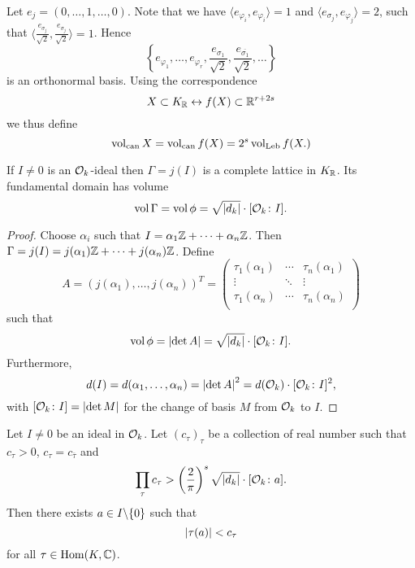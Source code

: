 
\begin{Bsp*}
Let $e_j =(0, \dots, 1,\dots, 0)$.
Note that we have
$\langle e_{\varphi_i} , e_{\varphi_i} \rangle = 1$
and
$\langle e_{\sigma_j} , e_{\varphi_j} \rangle = 2$, such that
 $\langle \frac{e_{\sigma_j}}{\sqrt{2}} , \frac{e_{\sigma_j}}{\sqrt{2}} \rangle = 1$.
 Hence
\[\left\{ e_{\varphi_1}, \dots, e_{\varphi_r}, \frac{e_{\sigma_1}}{\sqrt{2}}, \frac{e_{\overline{\sigma_1}}}{\sqrt{2}}, \dots
\right\}
\]
 is an orthonormal basis. Using the correspondence 
 \[ X \subset K_{\mathbb{R}} \leftrightarrow f(X) \subset \mathbb{R}^{r+2s}
 \]
 we thus define
\[ \operatorname{\operatorname{vol}_{can}} X = \operatorname{\operatorname{vol}_{can}} f(X) = 2^s \operatorname{\operatorname{vol}_{\operatorname{Leb}}} f(X.)
\]
\end{Bsp*}

\begin{Prop}
If $I \neq 0$ is an $\mathcal{O}_k$-ideal then $\Gamma = j(I)$ is a complete lattice in $K_{\mathbb{R}}$.
Its fundamental domain has volume
\[ \operatorname{vol} \Gamma = \operatorname{vol} \phi = \sqrt{\left|{d_k}\right|} \cdot [\mathcal{O}_k\colon I].
\]
\end{Prop}

\begin{proof}
Choose $\alpha_i$ such that $I=\alpha_1\mathbb{Z} +\dots + \alpha_n\mathbb{Z}$. Then 
$\Gamma = j(I) = j(\alpha_1)\mathbb{Z} +\dots + j(\alpha_n)\mathbb{Z}$. Define
\[ A = \left( j(\alpha_1), \dots, j(\alpha_n) \right)^T = \begin{pmatrix}
\tau_1(\alpha_1) & \cdots & \tau_n(\alpha_1) \\
\vdots & \ddots & \vdots \\
\tau_1(\alpha_n) & \cdots & \tau_n(\alpha_n) \\
\end{pmatrix}
\]
such that
\[ \operatorname{vol}\phi = \left|{\det A}\right| = \sqrt{\left|{d_k}\right|} \cdot [\mathcal{O}_k\colon I].
\]
Furthermore,
\[d(I) = d(\alpha_1, \dots, \alpha_n) = \left|{\det A}\right|^2 = d(\mathcal{O}_k) \cdot [\mathcal{O}_k\colon I]^2,
\]
with $[\mathcal{O}_k\colon I] = \left|{\det M}\right|$ for the change of basis $M$ from $\mathcal{O}_k$ to $I$.
\end{proof}


\begin{Satz}
Let $I\neq 0$ be an ideal in $\mathcal{O}_k$. Let $(c_\tau)_\tau$ be a collection of real number such that $c_\tau >0$, $c_\tau = c_{\overline{\tau}}$ and
\[ \prod_\tau c_\tau > \left(\frac{2}{\pi}\right)^s \sqrt{\left|{d_k}\right|} \cdot [\mathcal{O}_k\colon a].
\]
Then there exists $a \in I\backslash\{0\}$ such that
\[ \left|{\tau(a)}\right| < c_\tau
\]
for all $\tau \in \operatorname{Hom}(K,\mathbb{C})$.
\end{Satz}

